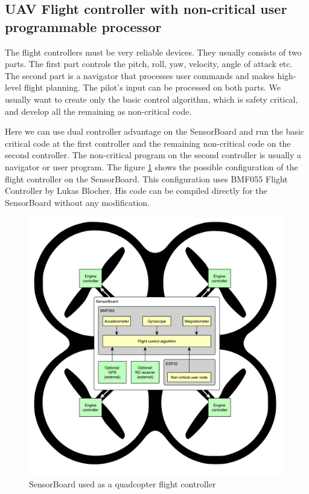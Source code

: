\subsection{UAV Flight controller with non-critical user programmable processor}
\label{ExampleBMF055FlightController}
The flight controllers must be very reliable devices. They usually consists of two parts. The first part controls the pitch, roll, yaw, velocity, angle of attack etc. The second part is a navigator that processes user commands and makes high-level flight planning. The pilot's input can be processed on both parts. We usually want to create only the basic control algorithm, which is safety critical, and develop all the remaining as non-critical code.

Here we can use dual controller advantage on the SensorBoard and run the basic critical code at the first controller and the remaining non-critical code on the second controller. The non-critical program on the second controller is usually a navigator or user program. The figure \ref{UEFlightController} shows the possible configuration of the flight controller on the SensorBoard. This configuration uses BMF055 Flight Controller \cite{BMF055flightController} by Lukas Blocher. His code can be compiled directly for the SensorBoard without any modification.

\begin{figure}[H]
	\centering
	\label{UEFlightController}
	\caption{SensorBoard used as a quadcopter flight controller}
	\includegraphics[width=16cm]{img/UsageExamplesFlightController.pdf}
\end{figure}


